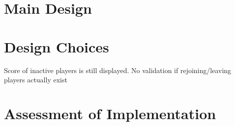 \documentclass{article}
\begin{document}
\section{Main Design}
	
\section{Design Choices}
Score of inactive players is still displayed.
No validation if rejoining/leaving players actually exist
	
	
\section{Assessment of Implementation}
\end{document}
